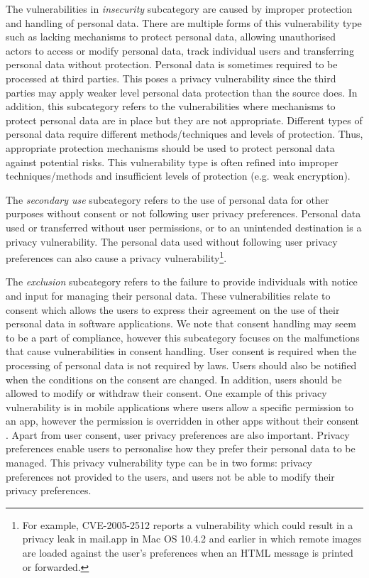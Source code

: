 The vulnerabilities in \emph{insecurity} subcategory are caused by improper protection and handling of personal data. There are multiple forms of this vulnerability type such as lacking mechanisms to protect personal data, allowing unauthorised actors to access or modify personal data, track individual users and transferring personal data without protection. Personal data is sometimes required to be processed at third parties. This poses a privacy vulnerability since the third parties may apply weaker level personal data protection than the source does. In addition, this subcategory refers to the vulnerabilities where mechanisms to protect personal data are in place but they are not appropriate. Different types of personal data require different methods/techniques and levels of protection. Thus, appropriate protection mechanisms should be used to protect personal data against potential risks. This vulnerability type is often refined into improper techniques/methods and insufficient levels of protection (e.g. weak encryption).

The \emph{secondary use} subcategory refers to the use of personal data for other purposes without consent or not following user privacy preferences. Personal data used or transferred without user permissions, or to an unintended destination is a privacy vulnerability. The personal data used without following user privacy preferences can also cause a privacy vulnerability\footnote{For example, CVE-2005-2512 reports a vulnerability which could result in a privacy leak in mail.app in Mac OS 10.4.2 and earlier in which remote images are loaded against the user's preferences when an HTML message is printed or forwarded.}.

The \emph{exclusion} subcategory refers to the failure to provide individuals with notice and input for managing their personal data. These vulnerabilities relate to consent which allows the users to express their agreement on the use of their personal data in software applications. We note that consent handling may seem to be a part of compliance, however this subcategory focuses on the malfunctions that cause vulnerabilities in consent handling. User consent is required when the processing of personal data is not required by laws. Users should also be notified when the conditions on the consent are changed. In addition, users should be allowed to modify or withdraw their consent. One example of this privacy vulnerability is in mobile applications where users allow a specific permission to an app, however the permission is overridden in other apps without their consent \cite{Calciati, Zhang2020a}. Apart from user consent, user privacy preferences are also important. Privacy preferences enable users to personalise how they prefer their personal data to be managed. This privacy vulnerability type can be in two forms: privacy preferences not provided to the users, and users not be able to modify their privacy preferences.

